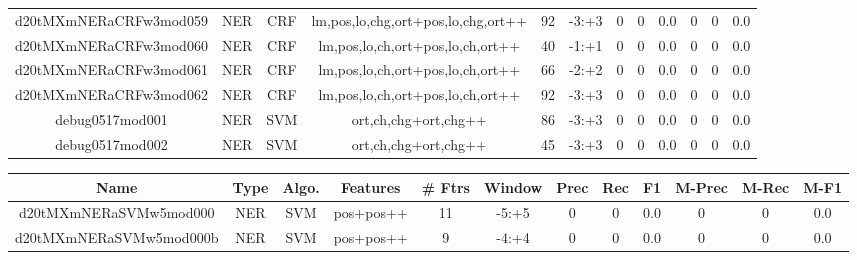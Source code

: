 \documentclass[a4paper]{article}
\begin{document}
\begin{landscape}
\begin{center}
\begin{tabular}{ |c|c|c|c|c|c|c|c|c|c|c|c|}
 
 	
 	\small{ d20tMXmNERaCRFw3mod059 } & \small{ NER} & \small{  CRF }  & lm,pos,lo,chg,ort+pos,lo,chg,ort++  &  92 &  \small{  -3:+3 }  &  0 & 0 & 0.0  &  0 & 0 & 0.0 \\
 	

 
 	
 	\small{ d20tMXmNERaCRFw3mod060 } & \small{ NER} & \small{  CRF }  & lm,pos,lo,ch,ort+pos,lo,ch,ort++  &  40 &  \small{  -1:+1 }  &  0 & 0 & 0.0  &  0 & 0 & 0.0 \\
 	

 
 	
 	\small{ d20tMXmNERaCRFw3mod061 } & \small{ NER} & \small{  CRF }  & lm,pos,lo,ch,ort+pos,lo,ch,ort++  &  66 &  \small{  -2:+2 }  &  0 & 0 & 0.0  &  0 & 0 & 0.0 \\
 	

 
 	
 	\small{ d20tMXmNERaCRFw3mod062 } & \small{ NER} & \small{  CRF }  & lm,pos,lo,ch,ort+pos,lo,ch,ort++  &  92 &  \small{  -3:+3 }  &  0 & 0 & 0.0  &  0 & 0 & 0.0 \\
 	

 
 	
 	\small{ debug0517mod001 } & \small{ NER} & \small{  SVM }  & ort,ch,chg+ort,chg++  &  86 &  \small{  -3:+3 }  &  0 & 0 & 0.0  &  0 & 0 & 0.0 \\
 	

 
 	
 	\small{ debug0517mod002 } & \small{ NER} & \small{  SVM }  & ort,ch,chg+ort,chg++  &  45 &  \small{  -3:+3 }  &  0 & 0 & 0.0  &  0 & 0 & 0.0 \\
 	
 \hline
\end{tabular}
\end{center}




\begin{center}
\begin{tabular}{ |c|c|c|c|c|c|c|c|c|c|c|c|} 
 \hline
 	Name & Type & Algo. & Features & \# Ftrs & Window & Prec & Rec & F1 & M-Prec & M-Rec & M-F1\\
 \hline

 	

 
 	
 	\small{ d20tMXmNERaSVMw5mod000 } & \small{ NER} & \small{  SVM }  & pos+pos++  &  11 &  \small{  -5:+5 }  &  0 & 0 & 0.0  &  0 & 0 & 0.0 \\
 	

 
 	
 	\small{ d20tMXmNERaSVMw5mod000b } & \small{ NER} & \small{  SVM }  & pos+pos++  &  9 &  \small{  -4:+4 }  &  0 & 0 & 0.0  &  0 & 0 & 0.0 \\
 	


\end{tabular}
\end{center}
\end{landscape}
\end{document}
